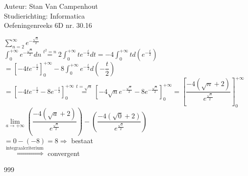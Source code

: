 \documentclass[a4paper]{article}
\begin{document}
  
\noindent \large Auteur: Stan Van Campenhout \\
\noindent \large Studierichting:  Informatica\\
\noindent \large Oefeningenreeks 6D nr. 30.16\\

\medskip

\normalsize

$ \displaystyle\sum\limits_{n = 2}^\infty e^{-\tfrac{\sqrt{n}}{2}} $\\

$ \displaystyle\int_0^{+\infty}e^{-\tfrac{\sqrt{n}}{2}}dn \stackrel{t^2 = n}{=} 2\displaystyle\int_0^{+\infty}te^{-\tfrac{t}{2}}dt
= -4\displaystyle\int_0^{+\infty}td\left(e^{-\tfrac{t}{2}}\right) $\\

$ = \left[-4te^{-\tfrac{t}{2}}\right]_0^{+\infty} - 8\displaystyle\int_0^{+\infty}e^{-\tfrac{t}{2}}d\left(-\dfrac{t}{2}\right) $\\

$ = \left[-4te^{-\tfrac{t}{2}}-8e^{-\tfrac{t}{2}}\right]_0^{+\infty} \stackrel{t = \sqrt{n}}{=} \left[-4\sqrt{n}e^{-\tfrac{\sqrt{n}}{2}}-8e^{-\tfrac{\sqrt{n}}{2}}\right]_0^{+\infty}
= \left[\dfrac{-4\left(\sqrt{n}+2\right)}{e^{\tfrac{\sqrt{n}}{2}}}\right]_0^{+\infty} $\\

$ \lim\limits_{a \rightarrow +\infty}\left(\dfrac{-4\left(\sqrt{a}+2\right)}{e^{\tfrac{\sqrt{a}}{2}}}\right) - \left(\dfrac{-4\left(\sqrt{0}+2\right)}{e^{\tfrac{\sqrt{0}}{2}}}\right) $\\

$ = 0 - \left(-8\right) = 8 \Rightarrow $ bestaat \\

$ \stackrel{\text{integraalcriterium}}{\Rightarrow} $ convergent \\

\begin{thebibliography}{999}
\end{thebibliography}
\end{document}

